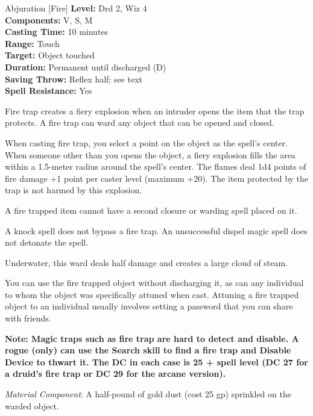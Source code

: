 {Abjuration [Fire]}
{
	\textbf{Level:}
	Drd 2, Wiz 4\\
	\textbf{Components:}
	V, S, M\\
	\textbf{Casting Time:}
	10 minutes\\
	\textbf{Range:}
	Touch\\
	\textbf{Target:}
	Object touched\\
	\textbf{Duration:}
	Permanent until discharged (D)\\
	\textbf{Saving Throw:}
	Reflex half; see text\\
	\textbf{Spell Resistance:}
	Yes\\
}
{
	Fire trap creates a fiery explosion when an intruder opens the item that the trap protects. A fire trap can ward any object that can be opened and closed.

	When casting fire trap, you select a point on the object as the spell's center. When someone other than you opens the object, a fiery explosion fills the area within a 1.5-meter radius around the spell's center. The flames deal 1d4 points of fire damage +1 point per caster level (maximum +20). The item protected by the trap is not harmed by this explosion.

	A fire trapped item cannot have a second closure or warding spell placed on it.

	A knock spell does not bypass a fire trap.  An unsuccessful dispel magic spell does not detonate the spell.

	Underwater, this ward deals half damage and creates a large cloud of steam.

	You can use the fire trapped object without discharging it, as can any individual to whom the object was specifically attuned when cast. Attuning a fire trapped object to an individual usually involves setting a password that you can share with friends.

	\textbf{Note: Magic traps such as fire trap are hard to detect and disable. A rogue (only) can use the Search skill to find a fire trap and Disable Device to thwart it. The DC in each case is 25 + spell level (DC 27 for a druid's fire trap or DC 29 for the arcane version).}

	\textit{Material Component}:
	A half-pound of gold dust (cost 25 gp) sprinkled on the warded object.

}
